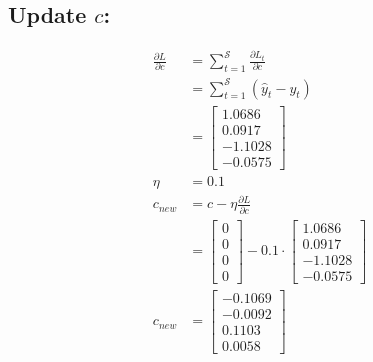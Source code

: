\documentclass{article}
\begin{document}
\subsection{Update $c$:}
\begin{align*}
\frac{\partial L}{\partial c} &= \sum_{t=1}^{\mathcal{S}} \frac{\partial L_t}{\partial c} \\
 &=\sum_{t=1}^{\mathcal{S}} (\hat{y}_{t} - y_{t})\\
 &=\begin{bmatrix}
1.0686 \\
0.0917 \\
-1.1028 \\
-0.0575
\end{bmatrix} \\
\eta &= 0.1\\
c_{new} &= c - \eta \frac{\partial L}{\partial c}\\
 &= \begin{bmatrix}
    0 \\
    0 \\
    0 \\
    0
\end{bmatrix} - 0.1 \cdot \begin{bmatrix}
1.0686 \\
0.0917 \\
-1.1028 \\
-0.0575
\end{bmatrix} \\
c_{new} &= \begin{bmatrix}
-0.1069 \\
-0.0092 \\
0.1103 \\
0.0058
\end{bmatrix}
\end{align*}
\end{document}
